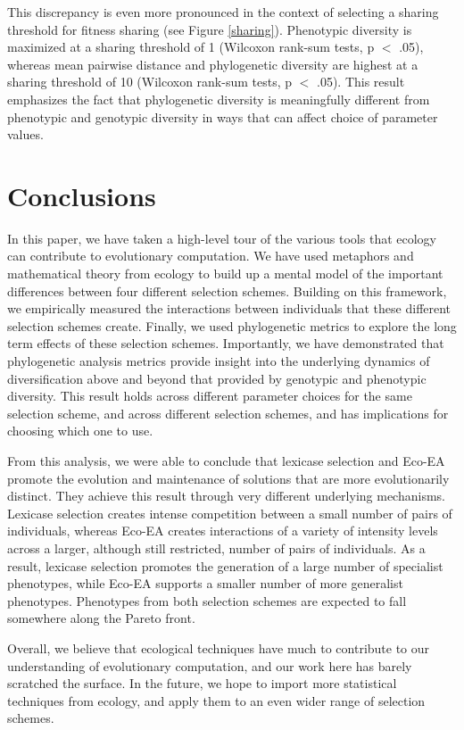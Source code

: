 This discrepancy is even more pronounced in the context of selecting a sharing threshold for fitness sharing (see Figure \ref{sharing}). Phenotypic diversity is maximized at a sharing threshold of 1  (Wilcoxon rank-sum tests, p $<$ .05), whereas mean pairwise distance and phylogenetic diversity are highest at a sharing threshold of 10 (Wilcoxon rank-sum tests, p $<$ .05). This result emphasizes the fact that phylogenetic diversity is meaningfully different from phenotypic and genotypic diversity in ways that can affect choice of parameter values.

\section{Conclusions}

In this paper, we have taken a high-level tour of the various tools that ecology can contribute to evolutionary computation. We have used metaphors and mathematical theory from ecology to build up a mental model of the important differences between four different selection schemes. Building on this framework, we empirically measured the interactions between individuals that these different selection schemes create. Finally, we used phylogenetic metrics to explore the long term effects of these selection schemes. Importantly, we have demonstrated that phylogenetic analysis metrics provide insight into the underlying dynamics of diversification above and beyond that provided by genotypic and phenotypic diversity. This result holds across different parameter choices for the same selection scheme, and across different selection schemes, and has implications for choosing which one to use.

From this analysis, we were able to conclude that lexicase selection and Eco-EA promote the evolution and maintenance of solutions that are more evolutionarily distinct. They achieve this result through very different underlying mechanisms. Lexicase selection creates intense competition between a small number of pairs of individuals, whereas Eco-EA creates interactions of a variety of intensity levels across a larger, although still restricted, number of pairs of individuals. As a result, lexicase selection promotes the generation of a large number of specialist phenotypes, while Eco-EA supports a smaller number of more generalist phenotypes. Phenotypes from both selection schemes are expected to fall somewhere along the Pareto front.

Overall, we believe that ecological techniques have much to contribute to our understanding of evolutionary computation, and our work here has barely scratched the surface. In the future, we hope to import more statistical techniques from ecology, and apply them to an even wider range of selection schemes.

